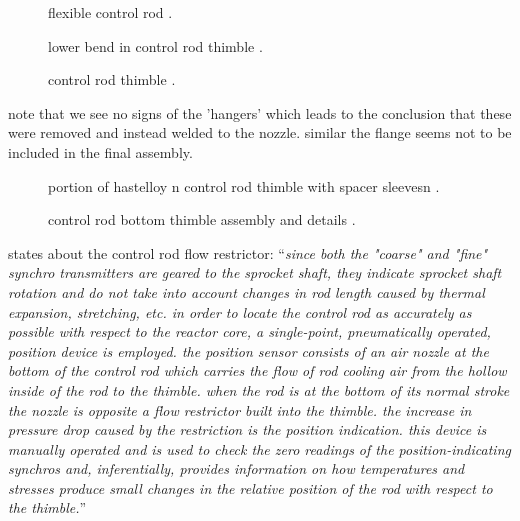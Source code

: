 \documentclass[ms,a4paper]{memoir}
\newcommand*{\mrsarchive}{../../msr-archive}%
\begin{document}
\begin{figure}[H]
  \centering
  \caption{flexible control rod \parencite[figure 2.5]{ornl-3419}.}
\end{figure}

\begin{figure}[H]
  \centering
  \caption{lower bend in control rod thimble \parencite[figure 2.5]{ornl-3419}.}
\end{figure}

\begin{figure}[H]
  \centering
  \caption{control rod thimble \parencite[figure 2.5]{ornl-3529}.}
\end{figure}
note that we see no signs of the 'hangers' which leads to the conclusion that these were removed and instead welded to the nozzle. similar the flange seems not to be included in the final assembly.

\begin{figure}[H]
  \centering
  \caption{portion of hastelloy n control rod thimble with spacer sleevesn \parencite[figure 13.10]{ornl-4676}.}
  \label{4676-fig13-10}
\end{figure}

\begin{figure}[H]
  \centering
  \caption{control rod bottom thimble assembly and details \parencite[figure 11]{ornl-tm-4174}.}
  \label{4174-fig11}
\end{figure}

\parencite[page 60]{ornl-tm-0729a} states about the control rod flow restrictor:
\enquote{\textit{since both the "coarse" and "fine" synchro transmitters are geared to the sprocket shaft, they indicate sprocket shaft rotation and do not take into account changes in rod length caused by thermal expansion, stretching, etc. in order to locate the control rod as accurately as possible with respect to the reactor core, a single-point, pneumatically operated, position device is employed. the position sensor consists of an air nozzle at the bottom of the control rod which carries the flow of rod cooling air from the hollow inside of the rod to the thimble. when the rod is at the bottom of its normal stroke the nozzle is opposite a flow restrictor built into the thimble. the increase in pressure drop caused by the restriction is the position indication. this device is manually operated and is used to check the zero readings of the position-indicating synchros and, inferentially, provides information on how temperatures and stresses produce small changes in the relative position of the rod with respect to the thimble.}}
\end{document}
